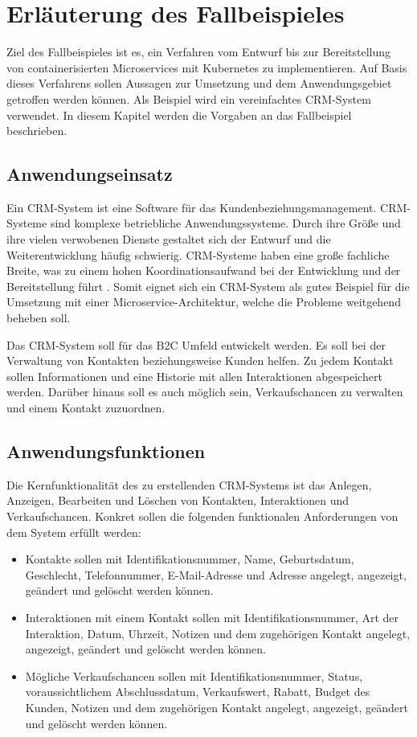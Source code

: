 \section{Erläuterung des Fallbeispieles}
Ziel des Fallbeispieles ist es, ein Verfahren vom Entwurf bis zur Bereitstellung von containerisierten Microservices mit Kubernetes zu implementieren. Auf Basis dieses Verfahrens sollen Aussagen zur Umsetzung und dem Anwendungsgebiet getroffen werden können. Als Beispiel wird ein vereinfachtes \ac{CRM}-System verwendet. In diesem Kapitel werden die Vorgaben an das Fallbeispiel beschrieben.

\subsection{Anwendungseinsatz}
Ein \ac{CRM}-System ist eine Software für das Kundenbeziehungsmanagement. \ac{CRM}-Systeme sind komplexe betriebliche Anwendungssysteme. Durch ihre Größe und ihre vielen verwobenen Dienste gestaltet sich der Entwurf und die Weiterentwicklung häufig schwierig. \ac{CRM}-Systeme haben eine große fachliche Breite, was zu einem hohen Koordinationsaufwand bei der Entwicklung und der Bereitstellung führt \parencite[vgl.][S. 62]{trempArchitekturen2021}. Somit eignet sich ein \ac{CRM}-System als gutes Beispiel für die Umsetzung mit einer Microservice-Architektur, welche die Probleme weitgehend beheben soll. 

Das \ac{CRM}-System soll für das \ac{B2C} Umfeld entwickelt werden. Es soll bei der Verwaltung von Kontakten beziehungsweise Kunden helfen. Zu jedem Kontakt sollen Informationen und eine Historie mit allen Interaktionen abgespeichert werden. Darüber hinaus soll es auch möglich sein, Verkaufschancen zu verwalten und einem Kontakt zuzuordnen.

\subsection{Anwendungsfunktionen}
Die Kernfunktionalität des zu erstellenden \ac{CRM}-Systems ist das Anlegen, Anzeigen, Bearbeiten und Löschen von Kontakten, Interaktionen und Verkaufschancen. Konkret sollen die folgenden funktionalen Anforderungen von dem System erfüllt werden:
\begin{itemize}
\item Kontakte sollen mit Identifikationsnummer, Name, Geburtsdatum, Geschlecht, Telefonnummer, E-Mail-Adresse und Adresse angelegt, angezeigt, geändert und gelöscht werden können.
\item Interaktionen mit einem Kontakt sollen mit Identifikationsnummer, Art der Interaktion, Datum, Uhrzeit, Notizen und dem zugehörigen Kontakt angelegt, angezeigt, geändert und gelöscht werden können.
\item Mögliche Verkaufschancen sollen mit Identifikationsnummer, Status, voraussichtlichem Abschlussdatum, Verkaufswert, Rabatt, Budget des Kunden, Notizen und dem zugehörigen Kontakt angelegt, angezeigt, geändert und gelöscht werden können.
\end{itemize} 


